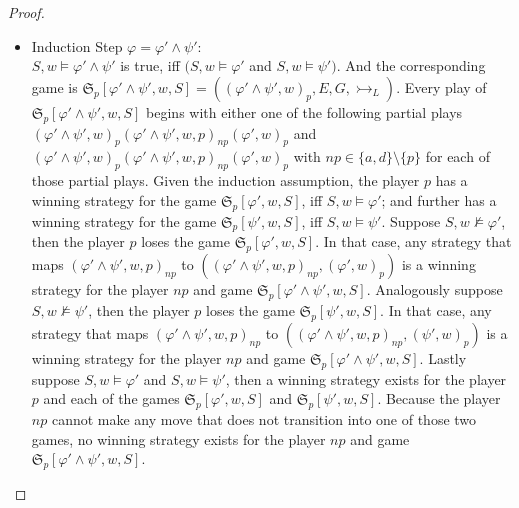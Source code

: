 \documentclass[a4paper,american]{paper}
\theoremstyle{definition}\newtheorem{definition}{Definition}
\begin{document}
\begin{proof}
\begin{itemize}
\item Induction Step $\varphi=\varphi'\wedge\psi'$:\\
$S,w\vDash\varphi'\wedge\psi'$ is true, iff $(S,w\vDash\varphi'$ and $S,w\vDash\psi')$. And the corresponding game is $\mathfrak{S}_p[\varphi'\wedge\psi',w,S]=((\varphi'\wedge\psi' ,w)_p, E, G, \rightarrowtail_L)$. Every play of $\mathfrak{S}_p[\varphi'\wedge\psi',w,S]$ begins with either one of the following partial plays $(\varphi'\wedge\psi' ,w)_p(\varphi'\wedge\psi' ,w,p)_{np}(\varphi' ,w)_p$ and $(\varphi'\wedge\psi' ,w)_p(\varphi'\wedge\psi' ,w,p)_{np}(\varphi' ,w)_p$ with $np\in\{a,d\}\setminus{}\{p\}$ for each of those partial plays. Given the induction assumption, the player $p$ has a winning strategy for the game $\mathfrak{S}_{p}[\varphi' ,w,S]$, iff $S,w\vDash\varphi'$; and further has a winning strategy for the game $\mathfrak{S}_{p}[\psi' ,w,S]$, iff $S,w\vDash\psi'$. Suppose $S,w\nvDash\varphi'$, then the player $p$ loses the game $\mathfrak{S}_{p}[\varphi' ,w,S]$. In that case, any strategy that maps $(\varphi'\wedge\psi',w,p)_{np}$ to $((\varphi'\wedge\psi' ,w,p)_{np},(\varphi' ,w)_p)$ is a winning strategy for the player $np$ and game $\mathfrak{S}_p[\varphi'\wedge\psi',w,S]$. Analogously suppose $S,w\nvDash\psi'$, then the player $p$ loses the game $\mathfrak{S}_{p}[\psi' ,w,S]$. In that case, any strategy that maps $(\varphi'\wedge\psi',w,p)_{np}$ to $((\varphi'\wedge\psi' ,w,p)_{np},(\psi' ,w)_p)$ is a winning strategy for the player $np$ and game $\mathfrak{S}_p[\varphi'\wedge\psi',w,S]$. Lastly suppose $S,w\vDash\varphi'$ and $S,w\vDash\psi'$, then a winning strategy exists for the player $p$ and each of the games $\mathfrak{S}_{p}[\varphi' ,w,S]$ and $\mathfrak{S}_{p}[\psi' ,w,S]$. Because the player $np$ cannot make any move that does not transition into one of those two games, no winning strategy exists for the player $np$ and game $\mathfrak{S}_p[\varphi'\wedge\psi',w,S]$.


\end{itemize}
\end{proof}
\end{document}
